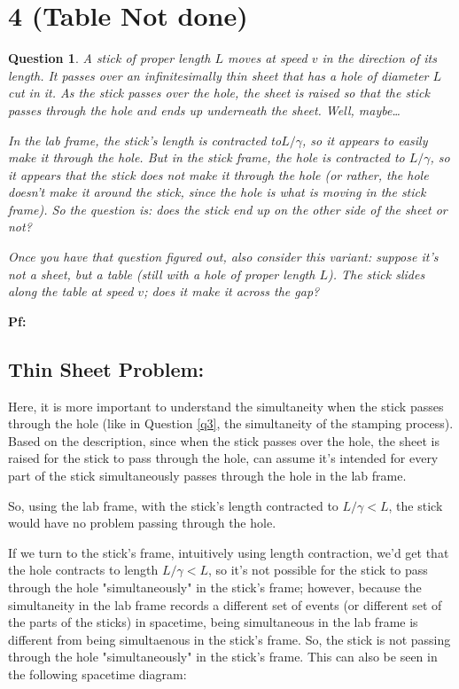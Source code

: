 \documentclass{article}
\newtheorem{question}{Question}
\begin{document}
\break

\section*{4 (Table Not done)}
\begin{question}\label{q4}
    A stick of proper length $L$ moves at speed $v$ in the direction of its length. It passes over an infinitesimally thin sheet that has a hole of diameter $L$ cut in it. As the stick passes over the hole, the sheet is raised so that the stick passes through the hole and ends up underneath the sheet. Well, maybe\dots

    In the lab frame, the stick's length is contracted to$L/\gamma$, so it appears to easily make it through the hole. But in the stick frame, the \emph{hole} is contracted to $L/\gamma$, so it appears that the stick does \emph{not} make it through the hole (or rather, the hole doesn't make it around the stick, since the hole is what is moving in the stick frame). So the question is: does the stick end up on the other side of the sheet or not?

    Once you have that question figured out, also consider this variant: suppose it's not a sheet, but a table (still with a hole of proper length $L$). The stick slides along the table at speed $v$; does it make it across the gap?
\end{question}

\textbf{Pf:}

\subsection*{Thin Sheet Problem:}
Here, it is more important to understand the simultaneity when the stick passes through the hole (like in Question \ref{q3}, the simultaneity of the stamping process). Based on the description, since when the stick passes over the hole, the sheet is raised for the stick to pass through the hole, can assume it's intended for every part of the stick simultaneously passes through the hole in the lab frame.

So, using the lab frame, with the stick's length contracted to $L/\gamma<L$, the stick would have no problem passing through the hole.

\hfil

If we turn to the stick's frame, intuitively using length contraction, we'd get that the hole contracts to length $L/\gamma<L$, so it's not possible for the stick to pass through the hole "simultaneously" in the stick's frame; however, because the simultaneity in the lab frame records a different set of events (or different set of the parts of the sticks) in spacetime, being simultaneous in the lab frame is different from being simultaenous in the stick's frame. So, the stick is not passing through the hole "simultaneously" in the stick's frame. This can also be seen in the following spacetime diagram:
\end{document}
